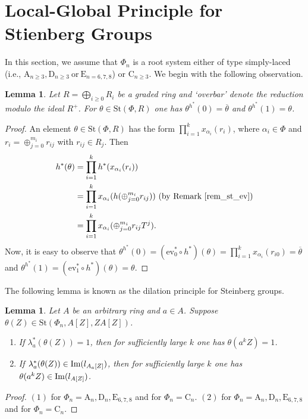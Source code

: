 \documentclass[11pt]{amsart}
\newtheorem{lem}[thm]{Lemma}
\theoremstyle{definition}
\numberwithin{equation}{section}
\numberwithin{equation}{section}
\newcommand{\A}{\mathrm{A}}
\newcommand{\C}{\mathrm{C}}
\newcommand{\D}{\mathrm{D}}
\newcommand{\E}{\mathrm{E}}
\newcommand{\Img}{{\rm Im}}
\newcommand{\<}{\langle}
\renewcommand{\>}{\rangle}
\newcommand{\St}{\mathrm{St}}
\newcommand{\ev}{\mathrm{ev}}
\begin{document}
\section{Local-Global Principle for Stienberg Groups}\label{sec:lgp}
In this section, we assume that $\Phi_{n}$ is a root system either of type simply-laced (i.e., $\A_{n\geq 3},\D_{n\geq 3}~\text{or}~\E_{n=6,7,8}$) or $\C_{n\geq 3}$. We begin with the following observation.
\begin{lem}
     Let $R=\bigoplus_{i\geq 0}R_{i}$ be a graded ring and `overbar' denote the reduction modulo the ideal $R^{+}$. For $\theta\in \St(\Phi,R)$ one has $\theta^{h^{\ast}}(0)=\overline{\theta}$ and $\theta^{h^{\ast}}(1)=\theta$. \label{lem_st_hom_sw}
\end{lem}
\begin{proof}
    An element $\theta\in \St(\Phi,R)$ has the form $\prod_{i=1}^{k}x_{\alpha_{i}}(r_{i})$, where $\alpha_{i}\in\Phi$ and $r_{i}=\oplus_{j=0}^{m_{i}} r_{ij}$ with $r_{ij}\in R_{j}$. Then 
    \[\begin{split}
        h^{\ast}(\theta) &=\prod_{i=1}^{k}h^{\ast}(x_{\alpha_{i}}(r_{i}))\\&=\prod_{i=1}^{k}x_{\alpha_{i}}(h(\oplus_{j=0}^{m_{i}} r_{ij}))~(\text{by Remark}~ \ref{rem_st_ev})\\
        &=\prod_{i=1}^{k}x_{\alpha_{i}}(\oplus_{j=0}^{m_{i}} r_{ij}T^{j}).
    \end{split}\]
    Now, it is easy to observe that $\theta^{h^{\ast}}(0)=(\ev_{0}^{\ast}\circ h^{\ast})(\theta)=\prod_{i=1}^{k}x_{\alpha_{i}}(r_{i0})=\overline{\theta}$ and $\theta^{h^{\ast}}(1)=(\ev_{1}^{\ast}\circ h^{\ast})(\theta)=\theta$.
\end{proof}
The following lemma is known as the dilation principle for Steinberg groups.
\begin{lem}
    Let $A$ be an arbitrary ring and $a\in A$. Suppose $\theta(Z)\in \St(\Phi_{n},A[Z], ZA[Z])$.\begin{enumerate}
        \item If $\lambda_{a}^{\ast}(\theta(Z))=1$, then for sufficiently large $k$ one has $\theta(a^kZ)=1$.
        \item If $\lambda_{a}^{\ast}(\theta(Z))\in\Img(l_{A_{a}[Z]})$, then for sufficiently large $k$ one has $\theta(a^kZ)\in\Img(l_{A[Z]})$.
    \end{enumerate} \label{lem_dilation}
\end{lem}
\begin{proof}
    $(1)$ \cite[Proposition 2.2]{LaSi17} for $\Phi_n=\A_n,\D_n,\E_{6,7,8}$ and \cite[Lemma 3.1]{La18} for $\Phi_n=\C_n$. $(2)$ \cite[Lemma 5.1]{Si25} for $\Phi_n=\A_n,\D_n,\E_{6,7,8}$ and \cite[Lemma 3.1]{La18} for $\Phi_n=\C_n$.
\end{proof}
\end{document}
